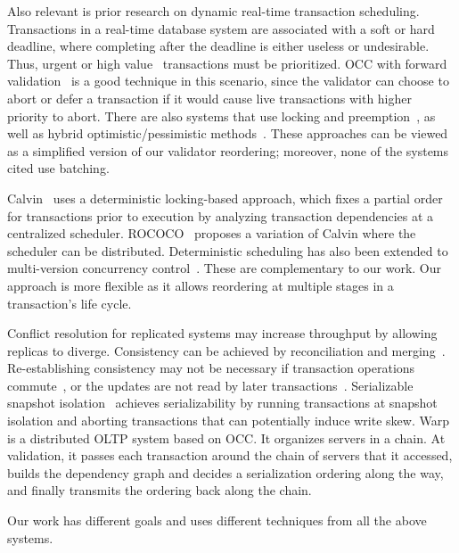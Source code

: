 Also relevant is prior research on dynamic real-time transaction scheduling. 
Transactions in a real-time database system are associated with a soft or hard deadline, where completing after the deadline is either useless or undesirable.
Thus, urgent or high value~\cite{haritsa1993value} transactions must be prioritized.
OCC with forward validation~\cite{haritsa1990dynamic, lam1995real,lee1993using} is a good technique in this scenario, since the validator can choose to abort or defer a transaction if it would cause live transactions with higher priority to abort. There are also systems that use locking and preemption~\cite{abbott1992scheduling}, as well as hybrid optimistic/pessimistic methods~\cite{lin1990concurrency,huang1991experimental}. These approaches can be viewed as a simplified version of our validator reordering; moreover, none of the systems cited use batching. 

Calvin~\cite{thomson2012calvin} uses a deterministic locking-based approach, which fixes a partial order for transactions prior to execution by analyzing transaction dependencies at a centralized scheduler. ROCOCO~\cite{mu2014extracting} proposes a variation of Calvin where the scheduler can be distributed. Deterministic scheduling has also been extended to multi-version concurrency control~\cite{faleiro2014rethinking}. These are complementary to our work. Our approach is more flexible as it allows reordering at multiple stages in a transaction's life cycle. 


Conflict resolution for replicated systems may increase throughput by allowing replicas to diverge. Consistency can be achieved by reconciliation and merging~\cite{petersen1997flexible}. Re-establishing consistency may not be necessary if transaction operations commute~\cite{li2012making, roy2015homeostasis}, or the updates are not read by later transactions~\cite{li2012making,faleiro2014lazy}. Serializable snapshot isolation~\cite{jorwekar2007automating} achieves serializability by running transactions at snapshot isolation and aborting transactions that can potentially induce write skew. Warp~\cite{warp} is a distributed OLTP system based on OCC. It organizes servers in a chain. At validation, it passes each transaction around the chain of servers that it accessed, builds the dependency graph and decides a serialization ordering along the way, and finally transmits the ordering back along the chain. 

Our work has different goals and uses different techniques from all the above systems.


